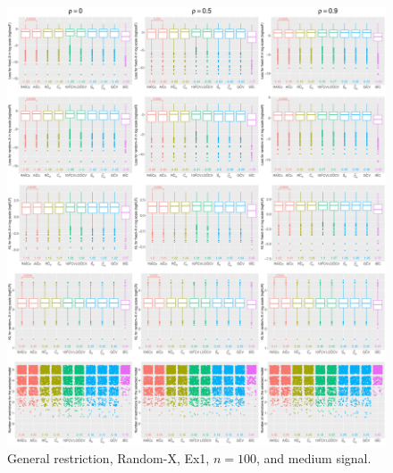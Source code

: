 \clearpage
\begin{figure}[!ht]
\centering
\includegraphics[width=\textwidth]{figures/supplement/randomx/general_restriction/Ex1_n100_msnr.eps}
\caption{General restriction, Random-X, Ex1, $n=100$, and medium signal.}
\end{figure}
\clearpage

